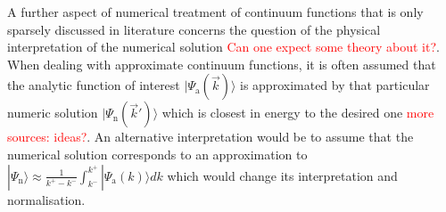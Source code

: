 A further aspect of numerical treatment of continuum functions that is only sparsely discussed in literature concerns the question of the physical interpretation of the numerical solution \textcolor{red}{Can one expect some theory about it?}.
When dealing with approximate continuum functions, it is often assumed that the analytic function of interest $|\Psi_\text{a}(\vec{k})\rangle$ is approximated by that particular numeric solution $|\Psi_\text{n}(\vec{k}')\rangle$ which is closest in energy to the desired one \cite{H2pDeCleva} \textcolor{red}{more sources: ideas?}.
An alternative interpretation would be to assume that the numerical solution corresponds to an approximation to $|\Psi_\text{n}\rangle \approx \frac{1}{k^+-k^-} \int_{k^-}^{k^+}|\Psi_\text{a}(k) \rangle dk$ which would change its interpretation and normalisation.
%

